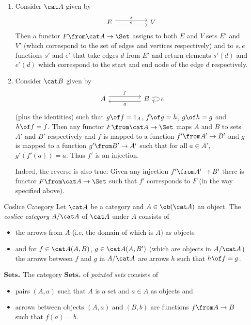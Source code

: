 \begin{answer}
  \begin{enumerate}
  \item Consider $\A$ given by
    \[
      \begin{tikzcd}[column sep=huge,row sep=huge]
        E\arrow[r,yshift=.85ex,"s"] \arrow[r,below,yshift=-.85ex,"e"]&V
      \end{tikzcd}
    \]
    Then a functor $F\from \A\to\Set$ assigns to both $E$ and $V$ sets $E'$ and $V'$ (which correspond to the set of edges and vertices respectively) and to $s,e$ functions $s'$ and $e'$ that take edges $d$ from $E'$ and return elements $s'(d)$ and $e'(d)$ which correspond to the start and end node of the edge $d$ respectively.
  \item Consider $\B$ given by
    \[
      \begin{tikzcd}[column sep=huge,row sep=huge]
        A\arrow[r,yshift=.85ex,"f"] & B\arrow[l,below,yshift=-.85ex,"g"] \arrow[loop right,"h"]
      \end{tikzcd}
    \]
    (plus the identities) such that $g\of f=1_A$, $f\of g=h$, $g\of h=g$ and $h\of f=f$. Then any functor $F\from\A\to\Set$ maps $A$ and $B$ to sets $A'$ and $B'$ respectively and $f$ is mapped to a function $f'\from A'\to B'$ and $g$ is mapped to a function $g'\from B'\to A'$ such that for all $a\in A'$, $g'(f'(a))=a$. Thus $f'$ is an injection.

    Indeed, the reverse is also true: Given any injection $f'\from A'\to B'$ there is functor $F\from \A\to\Set$ such that $f'$ corresponds to $F$ (in the way specified above).
  \end{enumerate}
\end{answer}


\begin{definition}{Coslice Category}
  Let $\A$ be a category and $A\in\ob(\A)$ an object. The \emph{coslice category} $A/\A$ of $\A$ under $A$ consists of
  \begin{itemize}
  \item the arrows from $A$ (i.e. the domain of which is $A$) as objects
  \item and for $f\in \A(A,B)$, $g\in\A(A,B')$ (which are objects in $A/\A$) the arrows between $f$ and $g$ in $A/\A$ are arrows $h$ such that $h\of f=g$.
  \end{itemize}
\end{definition}

\begin{definition}{$\mathbf{Sets_*}$}
  The category $\mathbf{Sets_*}$ of \emph{pointed sets} consists of
  \begin{itemize}
  \item pairs $(A,a)$ such that $A$ is a set and $a\in A$ as objects and
  \item arrows between objects $(A,a)$ and $(B,b)$ are functions $f\from A\to B$ such that $f(a)=b$.
  \end{itemize}
\end{definition}

